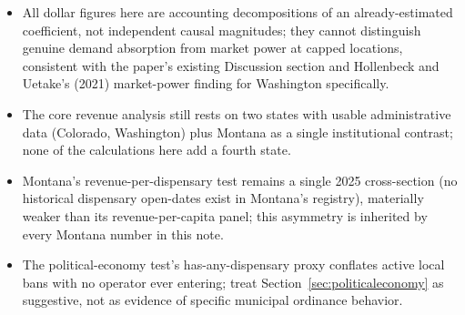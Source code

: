 \documentclass[11pt]{article}
\begin{document}
\begin{itemize}
\item All dollar figures here are accounting decompositions of an already-estimated coefficient, not
independent causal magnitudes; they cannot distinguish genuine demand absorption from market power at
capped locations, consistent with the paper's existing Discussion section and Hollenbeck and Uetake's
(2021) market-power finding for Washington specifically.
\item The core revenue analysis still rests on two states with usable administrative data (Colorado,
Washington) plus Montana as a single institutional contrast; none of the calculations here add a fourth
state.
\item Montana's revenue-per-dispensary test remains a single 2025 cross-section (no historical dispensary
open-dates exist in Montana's registry), materially weaker than its revenue-per-capita panel; this
asymmetry is inherited by every Montana number in this note.
\item The political-economy test's has-any-dispensary proxy conflates active local bans with no operator
ever entering; treat Section~\ref{sec:politicaleconomy} as suggestive, not as evidence of specific
municipal ordinance behavior.
\end{itemize}
\end{document}
